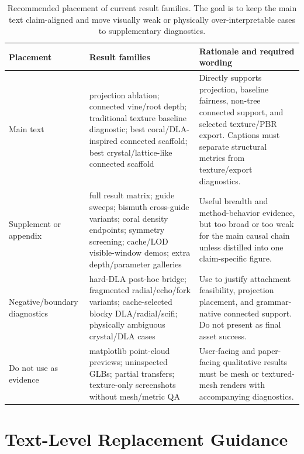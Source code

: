 \begin{table}[t]
  \centering
  \caption{Recommended placement of current result families. The goal is to
  keep the main text claim-aligned and move visually weak or physically
  over-interpretable cases to supplementary diagnostics.}
  \label{tab:reviewer-result-placement}
  \begin{tabular}{@{}p{}p{}p{}@{}}
    \toprule
    Placement & Result families & Rationale and required wording \\
    \midrule
    Main text &
    projection ablation; connected vine/root depth; traditional texture baseline diagnostic; best coral/DLA-inspired connected scaffold; best crystal/lattice-like connected scaffold &
    Directly supports projection, baseline fairness, non-tree connected support, and selected texture/PBR export. Captions must separate structural metrics from texture/export diagnostics. \\
    Supplement or appendix &
    full result matrix; guide sweeps; bismuth cross-guide variants; coral density endpoints; symmetry screening; cache/LOD visible-window demos; extra depth/parameter galleries &
    Useful breadth and method-behavior evidence, but too broad or too weak for the main causal chain unless distilled into one claim-specific figure. \\
    Negative/boundary diagnostics &
    hard-DLA post-hoc bridge; fragmented radial/echo/fork variants; cache-selected blocky DLA/radial/scifi; physically ambiguous crystal/DLA cases &
    Use to justify attachment feasibility, projection placement, and grammar-native connected support. Do not present as final asset success. \\
    Do not use as evidence &
    matplotlib point-cloud previews; uninspected GLBs; partial transfers; texture-only screenshots without mesh/metric QA &
    User-facing and paper-facing qualitative results must be mesh or textured-mesh renders with accompanying diagnostics. \\
    \bottomrule
  \end{tabular}
\end{table}

\section{Text-Level Replacement Guidance}


